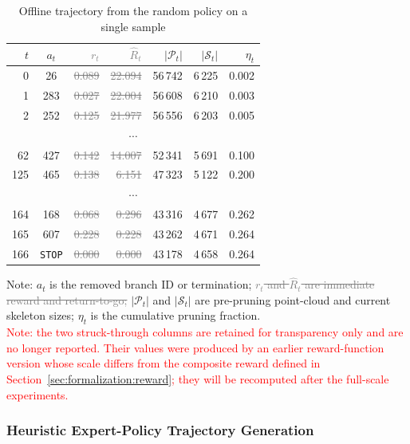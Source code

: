 \documentclass[12pt,a4paper,fontset=fandol]{ctexart}
\newcommand{\old}[1]{\textcolor{gray}{\sout{#1}}}
\newcommand{\rev}[1]{\textcolor{red}{#1}}
\begin{document}
\begin{table}[H]
\centering
\small
\setlength{\tabcolsep}{6pt}
\renewcommand{\arraystretch}{1.15}
\begin{tabular}{rcrrrrr}
\toprule
$t$ & $a_t$ & \old{$r_t$} & \old{$\hat{R}_t$} & $|\mathcal{P}_t|$ & $|\mathcal{S}_t|$ & $\eta_t$ \\
\midrule
0   & 26           & \old{0.089} & \old{22.094} & 56\,742 & 6\,225 & 0.002 \\
1   & 283          & \old{0.027} & \old{22.004} & 56\,608 & 6\,210 & 0.003 \\
2   & 252          & \old{0.125} & \old{21.977} & 56\,556 & 6\,203 & 0.005 \\
\multicolumn{7}{c}{$\cdots$} \\
62  & 427          & \old{0.142} & \old{14.007} & 52\,341 & 5\,691 & 0.100 \\
125 & 465          & \old{0.138} & \old{6.151}  & 47\,323 & 5\,122 & 0.200 \\
\multicolumn{7}{c}{$\cdots$} \\
164 & 168          & \old{0.068} & \old{0.296}  & 43\,316 & 4\,677 & 0.262 \\
165 & 607          & \old{0.228} & \old{0.228}  & 43\,262 & 4\,671 & 0.264 \\
166 & \texttt{STOP}& \old{0.000} & \old{0.000}  & 43\,178 & 4\,658 & 0.264 \\
\bottomrule
\end{tabular}
\caption{Offline trajectory from the random policy on a single sample}
\label{tab:random_traj_example}
\vspace{2pt}

\small Note: $a_t$ is the removed branch ID or termination; \old{$r_t$ and $\hat{R}_t$ are immediate reward and return-to-go;}
$|\mathcal{P}_t|$ and $|\mathcal{S}_t|$ are pre-pruning point-cloud and current skeleton sizes; $\eta_t$ is the cumulative pruning fraction.\\
\rev{Note: the two struck-through columns are retained for transparency only and are no longer reported. Their values were produced by an earlier reward-function version whose scale differs from the composite reward defined in Section~\ref{sec:formalization:reward}; they will be recomputed after the full-scale experiments.}
\end{table}


\subsubsection{Heuristic Expert-Policy Trajectory Generation}
\end{document}
